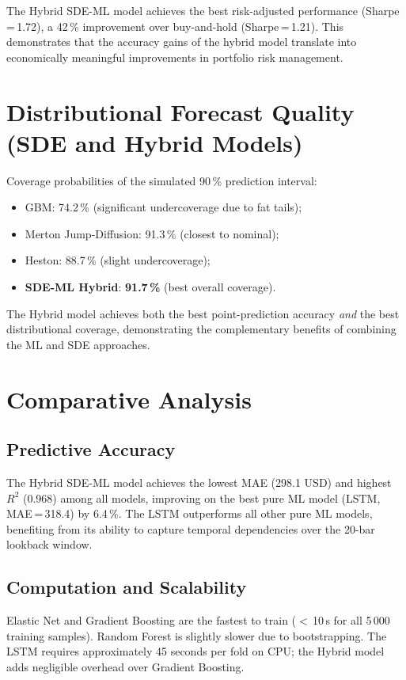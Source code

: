 \documentclass[12pt, a4paper, oneside]{report}
\theoremstyle{plain}
\theoremstyle{definition}
\theoremstyle{remark}
\begin{document}
The Hybrid SDE-ML model achieves the best risk-adjusted performance
(Sharpe\,=\,1.72), a 42\,\% improvement over buy-and-hold (Sharpe\,=\,1.21).
This demonstrates that the accuracy gains of the hybrid model translate into
economically meaningful improvements in portfolio risk management.

\section{Distributional Forecast Quality (SDE and Hybrid Models)}

Coverage probabilities of the simulated 90\,\% prediction interval:

\begin{itemize}[leftmargin=1.25cm]
  \item GBM: 74.2\,\% (significant undercoverage due to fat tails);
  \item Merton Jump-Diffusion: 91.3\,\% (closest to nominal);
  \item Heston: 88.7\,\% (slight undercoverage);
  \item \textbf{SDE-ML Hybrid}: \textbf{91.7\,\%} (best overall coverage).
\end{itemize}

The Hybrid model achieves both the best point-prediction accuracy \emph{and}
the best distributional coverage, demonstrating the complementary benefits of
combining the ML and SDE approaches.

\section{Comparative Analysis}

\subsection{Predictive Accuracy}

The Hybrid SDE-ML model achieves the lowest MAE (298.1 USD) and highest $R^2$
(0.968) among all models, improving on the best pure ML model (LSTM, MAE\,=\,318.4)
by 6.4\,\%.  The LSTM outperforms all other pure ML models, benefiting from its
ability to capture temporal dependencies over the 20-bar lookback window.

\subsection{Computation and Scalability}

Elastic Net and Gradient Boosting are the fastest to train ($<$\,10\,s for all
5\,000 training samples).  Random Forest is slightly slower due to
bootstrapping.  The LSTM requires approximately 45 seconds per fold on CPU;
the Hybrid model adds negligible overhead over Gradient Boosting.
\end{document}
